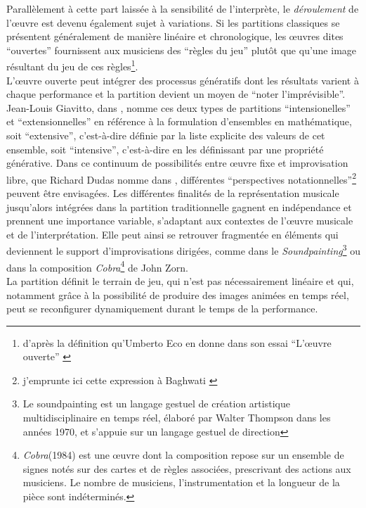 \noindent Parallèlement à cette part laissée à la sensibilité de l'interprète, le \textit{déroulement} de l'œuvre est devenu également sujet à variations. Si les partitions classiques se présentent généralement de manière linéaire et chronologique, les œuvres dites ``ouvertes'' fournissent aux musiciens des ``règles du jeu'' plutôt que qu'une image résultant du jeu de ces règles\footnote{d'après la définition qu'Umberto Eco en donne dans son essai ``L'œuvre ouverte'' \cite{eco_oeuvre_2015}}.\\
\indent L'œuvre ouverte peut intégrer des processus génératifs dont les résultats varient à chaque performance et la partition devient un moyen de ``noter l'imprévisible''\cite{rebelo_notating_2010}. Jean-Louis Giavitto, dans \cite{giavitto_du_2014}, nomme ces deux types de partitions ``intensionelles'' et ``extensionnelles'' en référence à la formulation d'ensembles en mathématique, soit ``extensive'', c'est-à-dire définie par la liste explicite des valeurs de cet ensemble, soit ``intensive'', c'est-à-dire en les définissant par une propriété générative.
\indent Dans ce continuum de possibilités entre œuvre fixe et improvisation libre, que Richard Dudas nomme  dans \cite{dudas_comprovisation:_2010}, différentes ``perspectives notationnelles''\footnote{j'emprunte ici cette expression à Baghwati \cite{bhagwati_notational_2013}} peuvent être envisagées. Les différentes finalités de la représentation musicale jusqu'alors intégrées dans la partition traditionnelle gagnent en indépendance et prennent une importance variable, s'adaptant aux contextes de l'œuvre musicale et de l'interprétation.
\indent Elle peut ainsi se retrouver fragmentée en éléments qui deviennent le support d'improvisations dirigées, comme dans le \textit{Soundpainting}\footnote{Le soundpainting est un langage gestuel de création artistique multidisciplinaire en temps réel, élaboré par Walter Thompson dans les années 1970, et s'appuie sur un langage gestuel de direction} ou dans la composition \textit{Cobra}\footnote{\textit{Cobra}(1984) est une œuvre dont la composition repose sur un ensemble de signes notés sur des cartes et de règles associées, prescrivant des actions aux musiciens. Le nombre de musiciens, l'instrumentation et la longueur de la pièce sont indéterminés.} de John Zorn.\\
\indent La partition définit le terrain de jeu, qui n'est pas nécessairement linéaire et qui, notamment grâce à la possibilité de produire des images animées en temps réel, peut se reconfigurer dynamiquement durant le temps de la performance.

